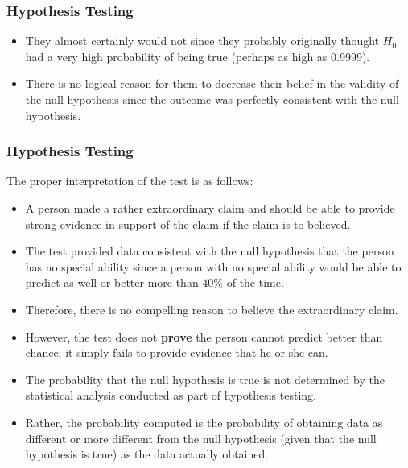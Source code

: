 ﻿\documentclass[a4]{beamer}
\begin{document}
\begin{frame}
\frametitle{Hypothesis Testing}
\begin{itemize}
\item They almost certainly would not since they probably originally thought $H_0$ had a very high probability of being true (perhaps as high as 0.9999). \item There is no logical reason for them to decrease their belief in the validity of the null hypothesis since the outcome was perfectly consistent with the null hypothesis. \end{itemize}
\end{frame}

\begin{frame}
\frametitle{Hypothesis Testing}

The proper interpretation of the test is as follows:

\begin{itemize} \item  A person made a rather extraordinary claim and should be able to provide strong evidence in support of the claim if the claim is to believed. \item The test provided data consistent with the null hypothesis that the person has no special ability since a person with no special ability would be able to predict as well or better more than $40\%$ of the time. \item Therefore, there is no compelling reason to believe the extraordinary claim. \end{itemize} \end{frame}


\begin{frame}
\begin{itemize}
\item However, the test does not \textbf{prove} the person cannot predict better than chance; it simply fails to provide evidence that he or she can. \item The probability that the null hypothesis is true is not determined by the statistical analysis conducted as part of hypothesis testing. \item Rather, the probability computed is the probability of obtaining data as different or more different from the null hypothesis (given that the null hypothesis is true) as the data actually obtained. 
\end{itemize}
\end{frame}
\end{document}
